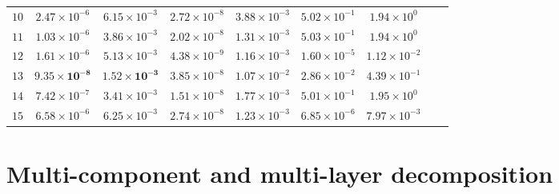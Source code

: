\documentclass[review,hidelinks,onefignum,onetabnum]{siamart250211}
\begin{document}
\begin{table}[h]
{\begin{tabular}{ccccccccc}
 $10$   &  $ 2.47 \times 10^{-6} $  &  $ 6.15 \times 10^{-3} $  &  $ 2.72 \times 10^{-8} $  &  $ 3.88 \times 10^{-3} $  &  $ 5.02 \times 10^{-1} $  &  $ 1.94 \times 10^{0} $ 
 \\ 

\rowcolor{mygray}$11$   &  $ 1.03 \times 10^{-6} $  &  $ 3.86 \times 10^{-3} $  &  $ 2.02 \times 10^{-8} $  &  $ 1.31 \times 10^{-3} $  &  $ 5.03 \times 10^{-1} $  &  $ 1.94 \times 10^{0} $ 
 \\ 

 $12$   &  $ 1.61 \times 10^{-6} $  &  $ 5.13 \times 10^{-3} $  &  $ 4.38 \times 10^{-9} $  &  $ 1.16 \times 10^{-3} $  &  $ 1.60 \times 10^{-5} $  &  $ 1.12 \times 10^{-2} $ 
 \\ 

\rowcolor{mygray}$13$   &  $ \bm{9.35 \times 10^{-8}} $  &  $ \bm{1.52 \times 10^{-3}} $  &  $ 3.85 \times 10^{-8} $  &  $ 1.07 \times 10^{-2} $  &  $ 2.86 \times 10^{-2} $  &  $ 4.39 \times 10^{-1} $ 
 \\ 

 $14$   &  $ 7.42 \times 10^{-7} $  &  $ 3.41 \times 10^{-3} $  &  $ 1.51 \times 10^{-8} $  &  $ 1.77 \times 10^{-3} $  &  $ 5.01 \times 10^{-1} $  &  $ 1.95 \times 10^{0} $ 
 \\ 

\rowcolor{mygray}$15$   &  $ 6.58 \times 10^{-6} $  &  $ 6.25 \times 10^{-3} $  &  $ 2.74 \times 10^{-8} $  &  $ 1.23 \times 10^{-3} $  &  $ 6.85 \times 10^{-6} $  &  $ 7.97 \times 10^{-3} $ 
 \\ 



 \bottomrule%
		\end{tabular} 
	}%
\end{table} 





\section{Multi-component and multi-layer decomposition}
\label{sec:decomposition}
\end{document}
